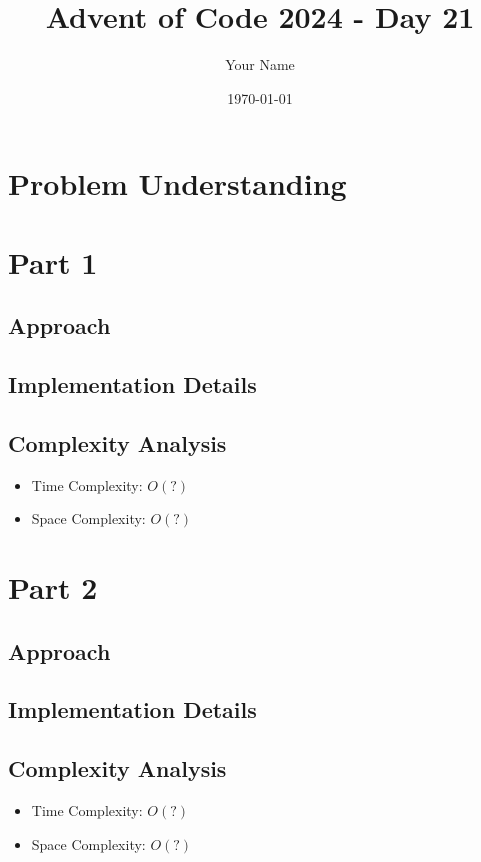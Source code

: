 \documentclass{article}
\title{Advent of Code 2024 - Day 21}
\author{Your Name}
\date{\today}
\begin{document}
\maketitle

\section{Problem Understanding}

\section{Part 1}
\subsection{Approach}

\subsection{Implementation Details}

\subsection{Complexity Analysis}
\begin{itemize}
    \item Time Complexity: $O(?)$
    \item Space Complexity: $O(?)$
\end{itemize}

\section{Part 2}
\subsection{Approach}

\subsection{Implementation Details}

\subsection{Complexity Analysis}
\begin{itemize}
    \item Time Complexity: $O(?)$
    \item Space Complexity: $O(?)$
\end{itemize}
\end{document}
